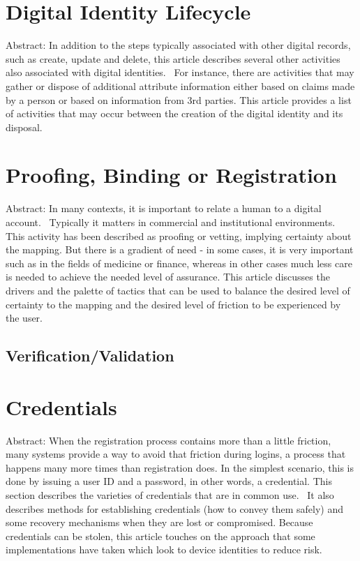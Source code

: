 \hypertarget{digital-identity-lifecycle}{%
\section{Digital Identity
Lifecycle}\label{digital-identity-lifecycle}}

Abstract: In addition to the steps typically associated with other
digital records, such as create, update and delete, this article
describes several other activities also associated with digital
identities.~ For instance, there are activities that may gather or
dispose of additional attribute information either based on claims made
by a person or based on information from 3rd parties. This article
provides a list of activities that may occur between the creation of the
digital identity and its disposal.

\hypertarget{proofing-binding-or-registration}{%
\section{Proofing, Binding or Registration
}\label{proofing-binding-or-registration}}

Abstract: In many contexts, it is important to relate a human to a
digital account.~ Typically it matters in commercial and institutional
environments. This activity has been described as proofing or vetting,
implying certainty about the mapping. But there is a gradient of need -
in some cases, it is very important such as in the fields of medicine or
finance, whereas in other cases much less care is needed to achieve the
needed level of assurance. This article discusses the drivers and the
palette of tactics that can be used to balance the desired level of
certainty to the mapping and the desired level of friction to be
experienced by the user.

\hypertarget{verificationvalidation}{%
\subsection{Verification/Validation}\label{verificationvalidation}}

\hypertarget{credentials}{%
\section{Credentials}\label{credentials}}

Abstract: When the registration process contains more than a little
friction, many systems provide a way to avoid that friction during
logins, a process that happens many more times than registration does.
In the simplest scenario, this is done by issuing a user ID and a
password, in other words, a credential. This section describes the
varieties of credentials that are in common use.~ It also describes
methods for establishing credentials (how to convey them safely) and
some recovery mechanisms when they are lost or compromised. Because
credentials can be stolen, this article touches on the approach that
some implementations have taken which look to device identities to
reduce risk.

